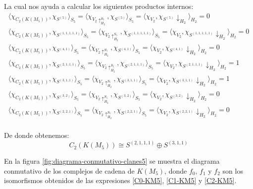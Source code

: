 \documentclass[12pt]{book}
\theoremstyle{definition}
\newcounter{in}
\begin{document}
La cual nos ayuda a calcular los siguientes productos internos:
\begin{eqnarray*}
  \langle\chi_{C_{2}(K(M_{5}))},\chi_{S^{(5)}}\rangle_{S_{5}}=\langle\chi_{V_{2}\uparrow^{S_{5}}_{H_{2}}},\chi_{S^{(5)}}\rangle_{S_{5}}=\langle\chi_{V_{2}},\chi_{S^{(5)}}\downarrow_{H_{2}}\rangle_{H_{2}}=0\\
  \langle\chi_{C_{2}(K(M_{5}))},\chi_{S^{(1,1,1,1,1)}}\rangle_{S_{5}}=\langle\chi_{V_{2}\uparrow^{S_{5}}_{H_{2}}},\chi_{S^{(1,1,1,1,1)}}\rangle_{S_{5}}=\langle\chi_{V_{2}},\chi_{S^{(1,1,1,1,1)}}\downarrow_{H_{2}}\rangle_{H_{2}}=0\\
  \langle\chi_{C_{2}(K(M_{5}))},\chi_{S^{(4,1)}}\rangle_{S_{5}}=\langle\chi_{V_{2}\uparrow^{S_{5}}_{H_{2}}},\chi_{S^{(4,1)}}\rangle_{S_{5}}=\langle\chi_{V_{2}},\chi_{S^{(4,1)}}\downarrow_{H_{2}}\rangle_{H_{2}}=0\\
  \langle\chi_{C_{2}(K(M_{5}))},\chi_{S^{(2,1,1,1)}}\rangle_{S_{5}}=\langle\chi_{V_{2}\uparrow^{S_{5}}_{H_{2}}},\chi_{S^{(2,1,1,1)}}\rangle_{S_{5}}=\langle\chi_{V_{2}},\chi_{S^{(2,1,1,1)}}\downarrow_{H_{2}}\rangle_{H_{2}}=1\\
  \langle\chi_{C_{2}(K(M_{5}))},\chi_{S^{(3,1,1)}}\rangle_{S_{5}}=\langle\chi_{V_{2}\uparrow^{S_{5}}_{H_{2}}},\chi_{S^{(3,1,1)}}\rangle_{S_{5}}=\langle\chi_{V_{2}},\chi_{S^{(3,1,1)}}\downarrow_{H_{2}}\rangle_{H_{2}}=1\\
  \langle\chi_{C_{2}(K(M_{5}))},\chi_{S^{(3,2)}}\rangle_{S_{5}}=\langle\chi_{V_{2}\uparrow^{S_{5}}_{H_{2}}},\chi_{S^{(3,2)}}\rangle_{S_{5}}=\langle\chi_{V_{2}},\chi_{S^{(3,2)}}\downarrow_{H_{2}}\rangle_{H_{2}}=0\\
  \langle\chi_{C_{2}(K(M_{5}))},\chi_{S^{(2,2,1)}}\rangle_{S_{5}}=\langle\chi_{V_{2}\uparrow^{S_{5}}_{H_{2}}},\chi_{S^{(2,2,1)}}\rangle_{S_{5}}=\langle\chi_{V_{2}},\chi_{S^{(2,2,1)}}\downarrow_{H_{2}}\rangle_{H_{2}}=0\\
\end{eqnarray*}

De donde obtenemos:
\begin{equation}
\label{C2-KM5}
C_{2}(K(M_{5}))\cong S^{(2,1,1,1)}\oplus S^{(3,1,1)}
\end{equation}

En la figura \ref{fig:diagrama-conmutativo-clanes5} se muestra el diagrama
conmutativo de los complejos de cadena de $K(M_{5})$, donde $f_{0}$,
$f_{1}$ y $f_{2}$ son los isomorfismos obtenidos de las expresiones
\ref{C0-KM5}, \ref{C1-KM5} y \ref{C2-KM5}.
\end{document}
